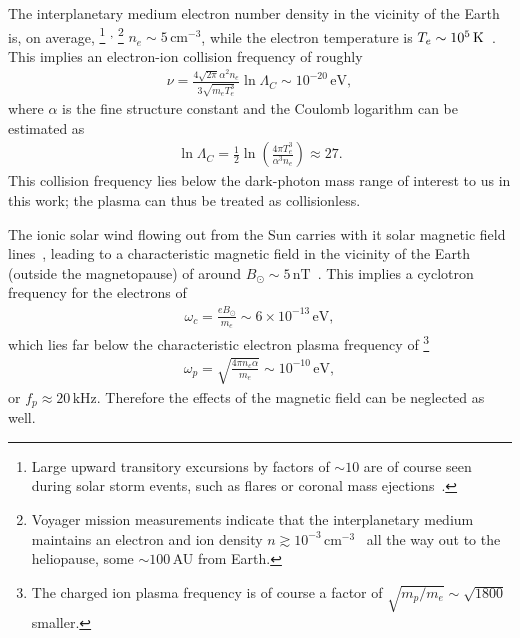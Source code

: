 \documentclass[amsmath,amssymb,aps,10pt,prd,letterpaper,nofootinbib,balancelastpage,notitlepage,superscriptaddress,twocolumn,floatfix]{revtex4-2}
\newcommand{\up}[1]{\textsuperscript{#1}}			%
\begin{document}
The interplanetary medium electron number density in the vicinity of the Earth is, on average,%
\footnote{\label{ftnt:SolarStorms}%
    Large upward transitory excursions by factors of $\sim 10$ are of course seen during solar storm events, such as flares or coronal mass ejections~\cite{ISSAUTIER20052141,celias-mtofARTICLE, celias-mtofDATASET, celias-mtofURL}.
}%
\up{,}%
\footnote{\label{ftnt:IPM}%
    Voyager mission measurements indicate that the interplanetary medium maintains an electron and ion density $n \gtrsim 10^{-3}\,\text{cm}^{-3}$~\cite{Gurnett_2019} all the way out to the heliopause, some $\sim 100\,$AU from Earth.
} %
$n_e\sim5\,\text{cm}^{-3}$,
while the electron temperature is $T_e\sim10^5\,\text K$~\cite{ISSAUTIER20052141, kallenrode2004space, russell}.
This implies an electron-ion collision frequency of roughly~\cite{Dubovsky:2015cca}
\begin{align}
    \nu=\frac{4\sqrt{2\pi}\alpha^2n_e}{3\sqrt{m_eT_e^3}}\ln\Lambda_C\sim10^{-20}\,\text{eV},
\end{align}
where $\alpha$ is the fine structure constant and the Coulomb logarithm can be estimated as~\cite{Dubovsky:2015cca}
\begin{align}
    \ln\Lambda_C=\frac12\ln\left(\frac{4\pi T_e^3}{\alpha^3n_e}\right)\approx27.
\end{align}
This collision frequency lies below the dark-photon mass range of interest to us in this work; the plasma can thus be treated as collisionless.

The ionic solar wind flowing out from the Sun carries with it solar magnetic field lines~\cite{1958ApJ...128..664P}, leading to a characteristic magnetic field in the vicinity of the Earth (outside the magnetopause) of around $B_{\odot}\sim5\,\text{nT}$~\cite{russell}.
This implies a cyclotron frequency for the electrons of
\begin{align}
    \omega_c=\frac{eB_{\odot}}{m_e}\sim6\times10^{-13}\,\text{eV},
\end{align}
which lies far below the characteristic electron plasma frequency of%
\footnote{\label{ftnt:ionPlasmaFreq}%
    The charged ion plasma frequency is of course a factor of $\sqrt{m_p/m_e} \sim \sqrt{1800}$ smaller. 
} %
\begin{align}
    \omega_p=\sqrt{\frac{4\pi n_e\alpha}{m_e}}\sim10^{-10}\,\text{eV},
\end{align}
or $f_p \approx 20\,\text{kHz}$.
Therefore the effects of the magnetic field can be neglected as well.
\end{document}
